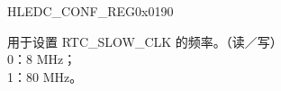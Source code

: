 \begin{register}{H}{LEDC\_CONF\_REG}{0x0190}\label{regdesc:LEDCCONFREG}
%
%
\regnewline%
\begin{regdesc}\begin{reglist}
\item [LEDC\_APB\_CLK\_SEL] 用于设置 RTC\_SLOW\_CLK 的频率。（读／写）\\
0：8 MHz；\\
1：80 MHz。
\end{reglist}\end{regdesc}
\end{register}

